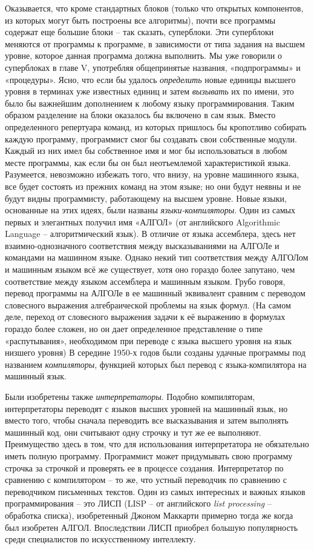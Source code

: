 \documentclass[../main.tex]{subfiles}
\begin{document}
Оказывается, что кроме стандартных блоков (только что открытых компонентов, из которых могут быть построены все алгоритмы), почти все программы содержат еще большие блоки \--- так сказать, суперблоки. Эти суперблоки меняются от программы к программе, в зависимости от типа задания на высшем уровне, которое данная программа должна выполнить. Мы уже говорили о суперблоках в главе V, употребляя общепринятые названия, «подпрограммы» и «процедуры». Ясно, что если бы удалось \emph{определить} новые единицы высшего уровня в терминах уже известных единиц и затем \emph{вызывать} их по имени, это было бы важнейшим дополнением к любому языку программирования. Таким образом разделение на блоки оказалось бы включено в сам язык. Вместо определенного репертуара команд, из которых пришлось бы кропотливо собирать каждую программу, программист смог бы создавать свои собственные модули. Каждый из них имел бы собственное имя и мог бы использоваться в любом месте программы, как если бы он был неотъемлемой характеристикой языка. Разумеется, невозможно избежать того, что внизу, на уровне машинного языка, все будет состоять из прежних команд на этом языке; но они будут неявны и не будут видны программисту, работающему на высшем уровне. Новые языки, основанные на этих идеях, были названы \emph{языки-компиляторы}. Один из самых первых и элегантных получил имя «АЛГОЛ» (от английского Algorithmic Language \--- алгоритмический язык). В отличие от языка ассемблера, здесь нет взаимно-однозначного соответствия между высказываниями на АЛГОЛе и командами на машинном языке. Однако некий тип соответствия между АЛГОЛом и машинным языком всё же существует, хотя оно гораздо более запутано, чем соответствие между языком ассемблера и машинным языком. Грубо говоря, перевод программы на АЛГОЛе в ее машинный эквивалент сравним с переводом словесного выражения алгебраической проблемы на язык формул. (На самом деле, переход от словесного выражения задачи к её выражению в формулах гораздо более сложен, но он дает определенное представление о типе «распутывания», необходимом при переводе с языка высшего уровня на язык низшего уровня) В середине 1950-х годов были созданы удачные программы под названием \emph{компиляторы}, функцией которых был перевод с языка-компилятора на машинный язык.

Были изобретены также \emph{интерпретаторы}. Подобно компиляторам, интерпретаторы переводят с языков высших уровней на машинный язык, но вместо того, чтобы сначала переводить все высказывания и затем выполнять машинный код, они считывают одну строчку и тут же ее выполняют. Преимущество здесь в том, что для использования интерпретатора не обязательно иметь полную программу. Программист может придумывать свою программу строчка за строчкой и проверять ее в процессе создания. Интерпретатор по сравнению с компилятором \--- то же, что устный переводчик по сравнению с переводчиком письменных текстов. Один из самых интересных и важных языков программирования \--- это ЛИСП (LISP \--- от английского \emph{list processing} \--- обработка списка), изобретенный Джоном Маккарти примерно тогда же когда был изобретен АЛГОЛ\@. Впоследствии ЛИСП приобрел большую популярность среди специалистов по искусственному интеллекту.
\end{document}
